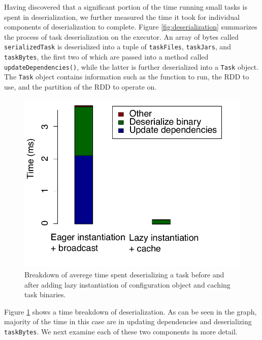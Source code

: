 Having discovered that a significant portion of the time running small tasks is spent in deserialization, we further measured the time it took for individual components of deserialization to complete. Figure \ref{fig:deserialization} summarizes the process of task deserialization on the executor. An array of bytes called \texttt{serializedTask} is deserialized into a tuple of \texttt{taskFiles}, \texttt{taskJars}, and \texttt{taskBytes}, the first two of which are passed into a method called \texttt{updateDependencies()}, while the latter is further deserialized into a \texttt{Task} object. The \texttt{Task} object contains information such as the function to run, the RDD to use, and the partition of the RDD to operate on.

\begin{figure}[t!]
 \begin{center}
   \includegraphics[scale=0.60]{images_graphs/optimizations/graph2/task_deser_micro.pdf}
 \end{center}
 \caption{Breakdown of averege time spent deserializing a task before and after adding lazy instantiation of configuration object and caching task binaries.}
 \label{fig:deserialization_times}
\end{figure}

Figure \ref{fig:deserialization_times} shows a time breakdown of deserialization. As can be seen in the graph, majority of the time in this case are in updating dependencies and deserializing \texttt{taskBytes}. We next examine each of these two components in more detail.

